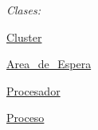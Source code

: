 {\itshape Clases\+:} 
\begin{DoxyItemize}
\item \mbox{\hyperlink{classCluster}{Cluster}} 
\item \mbox{\hyperlink{classArea__de__Espera}{Area\+\_\+de\+\_\+\+Espera}} 
\item \mbox{\hyperlink{classProcesador}{Procesador}} 
\item \mbox{\hyperlink{classProceso}{Proceso}} 
\end{DoxyItemize}